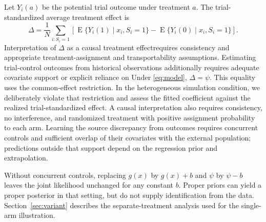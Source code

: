 \documentclass[11pt]{article}
\newcommand{\E}{\operatorname{E}}
\theoremstyle{remark}\newtheorem{remark}{Remark}[section]
\providecommand{\DIFaddtex}[1]{{\protect\color{blue} \sf #1}} %
\providecommand{\DIFdeltex}[1]{{\protect\color{red} \scriptsize #1}} %
\providecommand{\DIFaddbegin}{} %
\providecommand{\DIFaddend}{} %
\providecommand{\DIFdelbegin}{} %
\providecommand{\DIFdelend}{} %
\providecommand{\DIFadd}[1]{\texorpdfstring{\DIFaddtex{#1}}{#1}} %
\providecommand{\DIFdel}[1]{\texorpdfstring{\DIFdeltex{#1}}{}} %
\begin{document}
\DIFadd{Let $Y_i(a)$ be the potential trial outcome under treatment $a$. The trial-standardized average treatment effect is
}\begin{equation}\label{eq:contrast}
\Delta=\frac{1}N\sum_{i:S_i=1}
\left[\E\{Y_i(1)\mid x_i,S_i=1\}-\E\{Y_i(0)\mid x_i,S_i=1\}\right].
\end{equation}\DIFaddend 
\DIFdelbegin \DIFdel{Interpretation of $\Delta$ as a causal treatment effectrequires consistency and appropriate treatment-assignment and transportability assumptions. Estimating trial-control outcomes from historical observations additionally requires adequate covariate support or explicit reliance on }\DIFdelend \DIFaddbegin \DIFadd{Under \eqref{eq:model}, $\Delta=\psi$. This equality uses the common-effect restriction. In the heterogeneous simulation condition, we deliberately violate that restriction and assess the fitted coefficient against the realized trial-standardized effect. A causal interpretation also requires consistency, no interference, and randomized treatment with positive assignment probability to each arm. Learning the source discrepancy from outcomes requires concurrent controls and sufficient overlap of their covariates with the external population; predictions outside that support depend on the regression prior and }\DIFaddend extrapolation.

\DIFaddbegin \DIFadd{Without concurrent controls, replacing $g(x)$ by $g(x)+b$ and $\psi$ by $\psi-b$ leaves the joint likelihood unchanged for any constant $b$. Proper priors can yield a proper posterior in that setting, but do not supply identification from the data. Section~\ref{sec:variant} describes the separate-treatment analysis used for the single-arm illustration.
}
\end{document}
